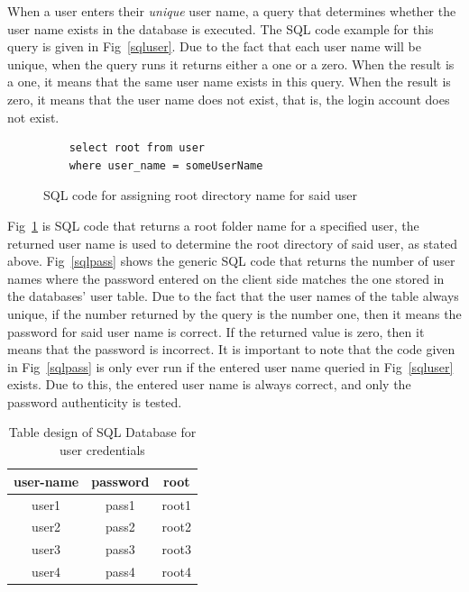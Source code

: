 \documentclass[journal, a4paper]{IEEEtran}
\begin{document}
When a user enters their \textit{unique} user name, a query that determines whether the user name exists in the database is executed. The SQL code example for this query is given in Fig~\ref{sqluser}. Due to the fact that each user name will be unique, when the query runs it returns either a one or a zero. When the result is a one, it means that the same user name exists in this query. When the result is zero, it means that the user name does not exist, that is, the login account does not exist.

\begin{figure}[hbtp]
	\begin{lstlisting}
	select root from user
	where user_name = someUserName
	\end{lstlisting}
	\caption{SQL code for assigning root directory name for said user}
	\label {sqlroot}
\end{figure}

Fig~\ref{sqlroot} is SQL code that returns a root folder name  for a specified user, the returned user name is used to determine the root directory of said user, as stated above. Fig~\ref{sqlpass} shows the generic SQL code that returns the number of user names where the password entered on the client side matches the one stored in the databases' user table. Due to the fact that the user names of the table always unique, if the number returned by the query is the number one, then it means the password for said user name is correct. If the returned value is zero, then it means that the password is incorrect. It is important to note that the code given in Fig~\ref{sqlpass} is only ever run if the entered user name queried in Fig~\ref{sqluser} exists. Due to this, the entered user name is always correct, and only the password authenticity is tested.



\begin{table}[hbtp!]
	\caption{Table design of SQL Database for user credentials}
	\label{tasks}
	\begin{center}
		\begin{tabular}{| c | c | c |}
			\hline
			user-name & password & root\\
			\hline
			user1 & pass1 & root1\\
			\hline
			user2 & pass2 & root2\\
			\hline
			user3 & pass3 & root3\\
			\hline
			user4 & pass4 & root4\\
			\hline
		\end{tabular}
	\end{center}
\end{table}
\end{document}

